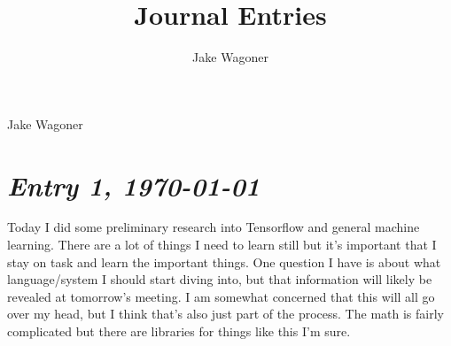 \documentclass{article}
\author{Jake Wagoner}
\title{Journal Entries}
\begin{document}
{\Large Jake Wagoner}\\

\section{\Large \itshape  Entry 1, \today}
	Today I did some preliminary research into Tensorflow and general machine learning.
There are a lot of things I need to learn still but it's important that I stay on task and learn the important things.
One question I have is about what language/system I should start diving into, but that information will likely be revealed at tomorrow's meeting.
I am somewhat concerned that this will all go over my head, but I think that's also just part of the process. The math is fairly complicated but there are libraries for things like this I'm sure.
\end{document}
